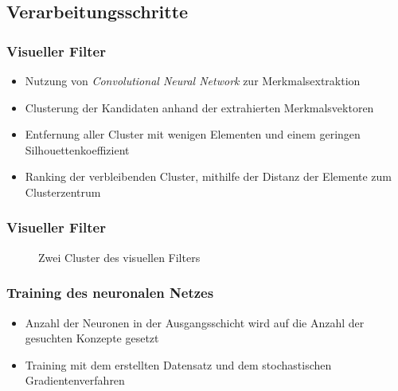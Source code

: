\documentclass[utf8]{beamer}
\begin{document}
\subsection{Verarbeitungsschritte}


\begin{frame}
    \frametitle{Visueller Filter}
            \begin{itemize}
                \item Nutzung von \emph{Convolutional Neural Network} zur Merkmalsextraktion
                \item Clusterung der Kandidaten anhand der extrahierten Merkmalsvektoren
                \item Entfernung aller Cluster mit wenigen Elementen und einem geringen Silhouettenkoeffizient
                \item Ranking der verbleibenden Cluster, mithilfe der Distanz der Elemente zum Clusterzentrum
            \end{itemize}
\end{frame}

\begin{frame}
    \frametitle{Visueller Filter}
    \begin{figure}
        \caption{Zwei Cluster des visuellen Filters}
    \end{figure}
\end{frame}

\begin{frame}
  \frametitle{Training des neuronalen Netzes}
  \begin{itemize}
    \item Anzahl der Neuronen in der Ausgangsschicht wird auf die Anzahl der gesuchten Konzepte gesetzt
    \item Training mit dem erstellten Datensatz und dem stochastischen Gradientenverfahren
  \end{itemize}
  \begin{figure}
  \end{figure}
\end{frame}
\end{document}
